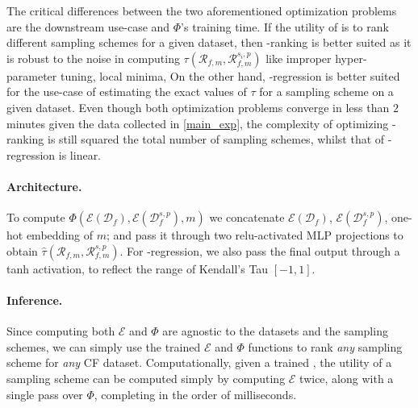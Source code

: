 The critical differences between the two aforementioned optimization problems are the downstream use-case and $\Phi$'s training time. If the utility of \oracle is to rank different sampling schemes for a given dataset, then \oracle-ranking is better suited as it is robust to the noise in computing $\tau(\mathcal{R}_{f, m}, \mathcal{R}_{f, m}^{s_i, p})$ like improper hyper-parameter tuning, local minima, \etc On the other hand, \oracle-regression is better suited for the use-case of estimating the exact values of $\tau$ for a sampling scheme on a given dataset. Even though both optimization problems converge in less than $2$ minutes given the data collected in \cref{main_exp}, the complexity of optimizing \oracle-ranking is still squared \wrt the total number of sampling schemes, whilst that of \oracle-regression is linear.

\paragraph{Architecture.} To compute $\Phi(\mathcal{E}(\mathcal{D}_f), \mathcal{E}(\mathcal{D}_f^{s, p}), m)$ we concatenate $\mathcal{E}(\mathcal{D}_f)$, $\mathcal{E}(\mathcal{D}_f^{s, p})$, one-hot embedding of $m$; and pass it through two relu-activated MLP projections to obtain $\hat{\tau}(\mathcal{R}_{f, m}, \mathcal{R}_{f, m}^{s, p})$. For \oracle-regression, we also pass the final output through a tanh activation, to reflect the range of Kendall's Tau \ie $[-1, 1]$.

\paragraph{Inference.} Since computing both $\mathcal{E}$ and $\Phi$ are agnostic to the datasets and the sampling schemes, we can simply use the trained $\mathcal{E}$ and $\Phi$ functions to rank \emph{any} sampling scheme for \emph{any} CF dataset. Computationally, given a trained \oracle, the utility of a sampling scheme can be computed simply by computing $\mathcal{E}$ twice, along with a single pass over $\Phi$, completing in the order of milliseconds.


